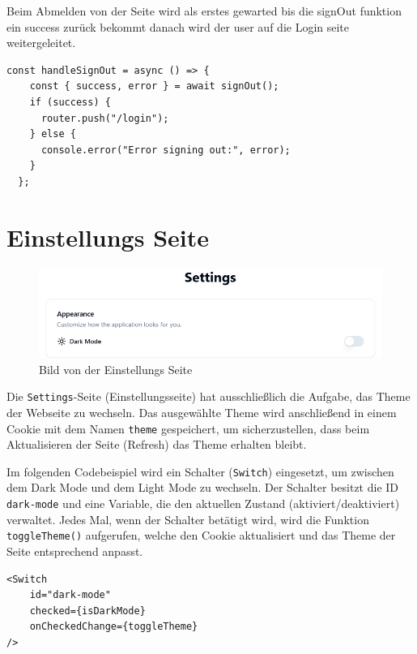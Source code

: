 \begin{inhalt}
\begin{enumerate}[label=\textbf{\arabic*.}]
Beim Abmelden von der Seite wird als erstes  gewarted bis die signOut funktion ein success zurück bekommt danach wird der user auf die Login seite weitergeleitet. 

\begin{lstlisting}[language=mytsx]
  const handleSignOut = async () => {
    const { success, error } = await signOut();
    if (success) {
      router.push("/login");
    } else {
      console.error("Error signing out:", error);
    }
  };
\end{lstlisting}


\newpage

\section{Einstellungs Seite}
\label{ref:settings}

\begin{figure}[!htb]
\centering
\includegraphics[width=1\textwidth]{files/Thomas/pics/Website/Settings/settings-component.png}
\caption[Bild von der Einstellungs Seite]{Bild von der Einstellungs Seite}
\label{fig:gehaeuse_internet_bild}
\end{figure}


Die \texttt{Settings}-Seite (Einstellungsseite) hat ausschließlich die Aufgabe, das Theme der Webseite zu wechseln.  
Das ausgewählte Theme wird anschließend in einem Cookie mit dem Namen \texttt{theme} gespeichert, um sicherzustellen, dass beim Aktualisieren der Seite (Refresh) das Theme erhalten bleibt.

\vspace{0.5cm}

Im folgenden Codebeispiel wird ein Schalter (\texttt{Switch}) eingesetzt, um zwischen dem Dark Mode und dem Light Mode zu wechseln.  
Der Schalter besitzt die ID \texttt{dark-mode} und eine Variable, die den aktuellen Zustand (aktiviert/deaktiviert) verwaltet.  
Jedes Mal, wenn der Schalter betätigt wird, wird die Funktion \texttt{toggleTheme()} aufgerufen, welche den Cookie aktualisiert und das Theme der Seite entsprechend anpasst.


\begin{lstlisting}[language=mytsx]
<Switch
    id="dark-mode"
    checked={isDarkMode}
    onCheckedChange={toggleTheme}
/>
\end{lstlisting}


\end{enumerate}
\end{inhalt}
